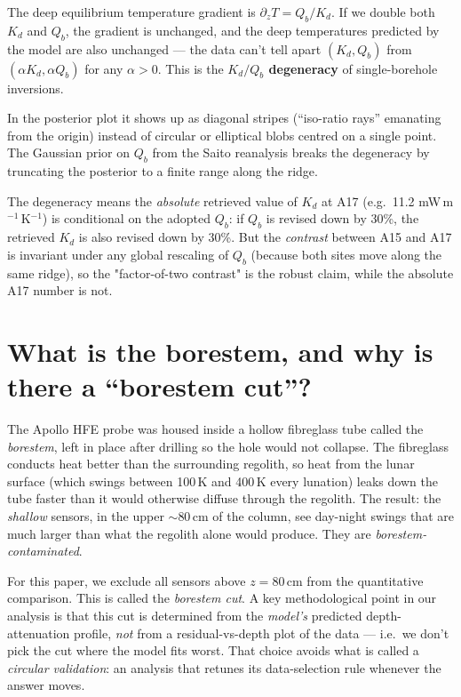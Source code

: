 \documentclass[11pt]{report}
\begin{document}
The deep equilibrium temperature gradient is $\partial_z T = Q_b / K_d$.
If we double both $K_d$ and $Q_b$, the gradient is unchanged, and
the deep temperatures predicted by the model are also unchanged ---
the data can't tell apart $(K_d, Q_b)$ from $(\alpha K_d, \alpha Q_b)$
for any $\alpha > 0$. This is the
\textbf{$K_d/Q_b$ degeneracy} of single-borehole inversions.

In the posterior plot it shows up as diagonal stripes
(``iso-ratio rays'' emanating from the origin) instead of circular
or elliptical blobs centred on a single point. The Gaussian prior
on $Q_b$ from the Saito reanalysis breaks the degeneracy by
truncating the posterior to a finite range along the ridge.

\begin{key}
The degeneracy means the \emph{absolute} retrieved value of $K_d$
at A17 (e.g.~11.2 mW\,m$^{-1}$\,K$^{-1}$) is conditional on the
adopted $Q_b$: if $Q_b$ is revised down by 30\%, the retrieved
$K_d$ is also revised down by 30\%. But the \emph{contrast}
between A15 and A17 is invariant under any global rescaling of
$Q_b$ (because both sites move along the same ridge), so the
"factor-of-two contrast" is the robust claim, while the absolute
A17 number is not.
\end{key}

\section{What is the borestem, and why is there a ``borestem cut''?}

The Apollo HFE probe was housed inside a hollow fibreglass tube
called the \emph{borestem}, left in place after drilling so the
hole would not collapse. The fibreglass conducts heat better than
the surrounding regolith, so heat from the lunar surface (which
swings between 100\,K and 400\,K every lunation) leaks down the
tube faster than it would otherwise diffuse through the regolith.
The result: the \emph{shallow} sensors, in the upper $\sim$80\,cm
of the column, see day-night swings that are much larger than what
the regolith alone would produce. They are
\emph{borestem-contaminated}.

For this paper, we exclude all sensors above $z = 80$\,cm from the
quantitative comparison. This is called the \emph{borestem cut}.
A key methodological point in our analysis is that this cut is
determined from the \emph{model's} predicted depth-attenuation
profile, \emph{not} from a residual-vs-depth plot of the data ---
i.e.\ we don't pick the cut where the model fits worst. That
choice avoids what is called a \emph{circular validation}: an
analysis that retunes its data-selection rule whenever the answer
moves.
\end{document}
